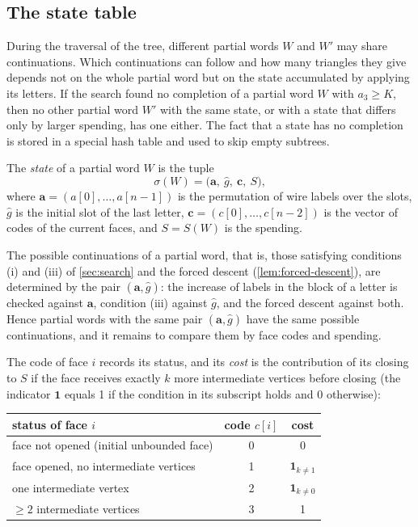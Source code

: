 \subsection{The state table}

During the traversal of the tree, different partial words $W$ and $W'$ may share continuations. Which continuations can follow and how many triangles they give depends not on the whole partial word but on the state accumulated by applying its letters.
If the search found no completion of a partial word $W$ with $a_3\ge K$, then no other partial word $W'$ with the same state, or with a state that differs only by larger spending, has one either. The fact that a state has no completion is stored in a special hash table and used to skip empty subtrees.

The \emph{state} of a partial word $W$ is the tuple
\[
\sigma(W)=\bigl(\mathbf a,\ \widehat g,\ \mathbf c,\ S\bigr),
\]
where $\mathbf a=(a[0],\ldots,a[n-1])$ is the permutation of wire labels over the slots, $\widehat g$ is the initial slot of the last letter, $\mathbf c=(c[0],\ldots,c[n-2])$ is the vector of codes of the current faces, and $S=S(W)$ is the spending.

The possible continuations of a partial word, that is, those satisfying conditions (i) and (iii) of \cref{sec:search} and the forced descent (\cref{lem:forced-descent}), are determined by the pair $(\mathbf a,\widehat g)$: the increase of labels in the block of a letter is checked against $\mathbf a$, condition (iii) against $\widehat g$, and the forced descent against both.
Hence partial words with the same pair $(\mathbf a,\widehat g)$ have the same possible continuations, and it remains to compare them by face codes and spending.

The code of face $i$ records its status, and its \emph{cost} is the contribution of its closing to $S$ if the face receives exactly $k$ more intermediate vertices before closing (the indicator $\mathbf 1$ equals 1 if the condition in its subscript holds and 0 otherwise):

\begin{center}
\small
\setlength{\tabcolsep}{4pt}
\begin{tabular}{>{\raggedright\arraybackslash}p{6.5cm}cc}
\toprule
status of face $i$ & code $c[i]$ & cost \\
\midrule
face not opened (initial unbounded face) & 0 & 0 \\
face opened, no intermediate vertices & 1 & $\mathbf 1_{k\ne1}$ \\
one intermediate vertex & 2 & $\mathbf 1_{k\ne0}$ \\
$\ge2$ intermediate vertices & 3 & 1 \\
\bottomrule
\end{tabular}
\end{center}


